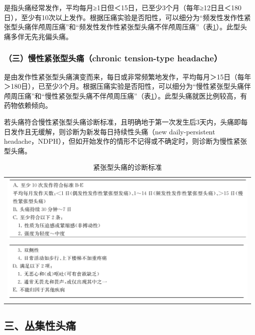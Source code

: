 是指头痛经常发作，平均每月≥1日但＜15日，已至少3个月（每年≥12日且＜180日），至少有10次以上发作。根据压痛实验是否阳性，可以细分为“频发性发作性紧张型头痛伴颅周压痛”和“频发性发作性紧张型头痛不伴颅周压痛”（表\ref{tab46-12}）。此型头痛多伴无先兆偏头痛。

\subsubsection{（三）慢性紧张型头痛（chronic tension-type headache）}

是由发作性紧张型头痛演变而来，每日或非常频繁地发作，平均每月＞15日（每年＞180日），已至少3个月。根据压痛实验是否阳性，可以细分为“慢性紧张型头痛伴颅周压痛”和“慢性紧张型头痛不伴颅周压痛”（表\ref{tab46-12}）。此型头痛就医比例较高，有药物依赖倾向。

若头痛符合慢性紧张型头痛诊断标准，且明确地于第一次发生后3天内，头痛即每日发作且无缓解，则诊断为新发每日持续性头痛（new
daily-persistent
headache，NDPH），但如开始发作的情形不记得或不确定时，则诊断为慢性紧张型头痛。

\begin{longtable}{c}
 \caption{紧张型头痛的诊断标准}
 \label{tab46-12}
 \endfirsthead
 \caption[]{紧张型头痛的诊断标准}
 \endhead
 \includegraphics[width=\textwidth,height=\textheight,keepaspectratio]{./images/Image00288.jpg}\\
 \includegraphics[width=\textwidth,height=\textheight,keepaspectratio]{./images/Image00289.jpg}
 \end{longtable}

\protect\hypertarget{text00349.html}{}{}

\subsection{三、丛集性头痛}

